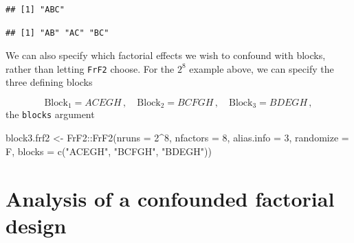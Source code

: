 \documentclass[
]{book}
\newenvironment{Shaded}{\begin{snugshade}}{\end{snugshade}}
\newcommand{\AttributeTok}[1]{\textcolor[rgb]{0.77,0.63,0.00}{#1}}
\newcommand{\DecValTok}[1]{\textcolor[rgb]{0.00,0.00,0.81}{#1}}
\newcommand{\FunctionTok}[1]{\textcolor[rgb]{0.00,0.00,0.00}{#1}}
\newcommand{\NormalTok}[1]{#1}
\newcommand{\OtherTok}[1]{\textcolor[rgb]{0.56,0.35,0.01}{#1}}
\newcommand{\SpecialCharTok}[1]{\textcolor[rgb]{0.00,0.00,0.00}{#1}}
\newcommand{\StringTok}[1]{\textcolor[rgb]{0.31,0.60,0.02}{#1}}
\theoremstyle{definition}
\theoremstyle{definition}
\theoremstyle{definition}
\theoremstyle{definition}
\theoremstyle{remark}
\begin{document}
\begin{Shaded}
\end{Shaded}

\begin{verbatim}
## [1] "ABC"
\end{verbatim}

\begin{Shaded}
\end{Shaded}

\begin{verbatim}
## [1] "AB" "AC" "BC"
\end{verbatim}

We can also specify which factorial effects we wish to confound with blocks, rather than letting \texttt{FrF2} choose. For the \(2^8\) example above, we can specify the three defining blocks

\[
\mathrm{Block}_{1}=ACEGH\,,\quad \mathrm{Block}_{2}=BCFGH\,,\quad \mathrm{Block}_{3}= BDEGH\,,
\]
the \texttt{blocks} argument

\begin{Shaded}
\begin{Highlighting}[]
\NormalTok{block3.frf2 }\OtherTok{\textless{}{-}}\NormalTok{ FrF2}\SpecialCharTok{::}\FunctionTok{FrF2}\NormalTok{(}\AttributeTok{nruns =} \DecValTok{2}\SpecialCharTok{\^{}}\DecValTok{8}\NormalTok{, }\AttributeTok{nfactors =} \DecValTok{8}\NormalTok{, }
                     \AttributeTok{alias.info =} \DecValTok{3}\NormalTok{, }\AttributeTok{randomize =}\NormalTok{ F, }\AttributeTok{blocks =} \FunctionTok{c}\NormalTok{(}\StringTok{"ACEGH"}\NormalTok{, }\StringTok{"BCFGH"}\NormalTok{, }\StringTok{"BDEGH"}\NormalTok{))}
\end{Highlighting}
\end{Shaded}

\hypertarget{analysis-of-a-confounded-factorial-design}{%
\section{Analysis of a confounded factorial design}\label{analysis-of-a-confounded-factorial-design}}
\end{document}
